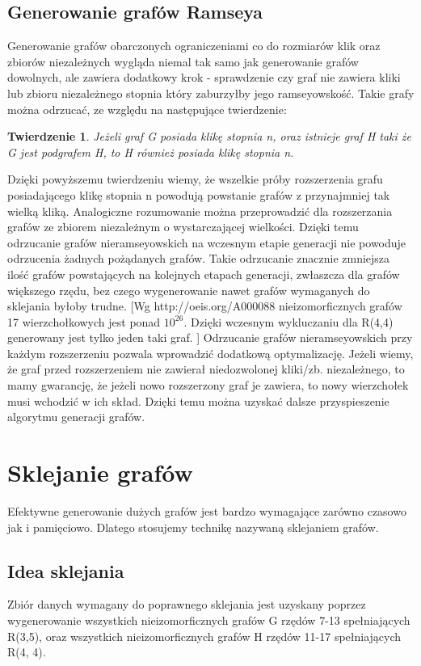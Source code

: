\documentclass[11pt]{article}
\newtheorem{theorem}{Twierdzenie}
\begin{document}
   \subsection{Generowanie grafów Ramseya}
   Generowanie grafów obarczonych ograniczeniami co do rozmiarów klik oraz zbiorów niezależnych wygląda niemal tak samo jak generowanie grafów dowolnych, 
   ale zawiera dodatkowy krok - sprawdzenie czy graf nie zawiera kliki lub zbioru niezależnego stopnia który zaburzyłby jego ramseyowskość. Takie grafy można odrzucać, ze względu na następujące twierdzenie:
     \begin{theorem}
      Jeżeli graf G posiada klikę stopnia n, oraz istnieje graf H taki że G jest podgrafem H, to H również posiada klikę stopnia n.
   \end{theorem}
  Dzięki powyższemu twierdzeniu wiemy, że wszelkie próby rozszerzenia grafu posiadającego klikę stopnia n powodują powstanie grafów z przynajmniej tak wielką kliką. Analogiczne rozumowanie można przeprowadzić dla rozszerzania grafów ze zbiorem niezależnym o wystarczającej wielkości. Dzięki temu odrzucanie grafów nieramseyowskich na wczesnym etapie generacji nie powoduje odrzucenia żadnych pożądanych grafów. Takie odrzucanie znacznie zmniejsza ilość grafów powstających na kolejnych etapach generacji, zwłaszcza dla grafów większego rzędu, bez czego wygenerowanie nawet grafów wymaganych do sklejania byłoby trudne.
[Wg http://oeis.org/A000088 nieizomorficznych grafów 17 wierzchołkowych jest ponad $10^{26}$. Dzięki wczesnym wykluczaniu dla R(4,4) generowany jest tylko jeden taki graf. ]
Odrzucanie grafów nieramseyowskich przy każdym rozszerzeniu pozwala wprowadzić dodatkową optymalizację. Jeżeli wiemy, że graf przed rozszerzeniem nie zawierał niedozwolonej kliki/zb. niezależnego, to mamy gwarancję, że jeżeli nowo rozszerzony graf je zawiera, to nowy wierzchołek musi wchodzić w ich skład. Dzięki temu można uzyskać dalsze przyspieszenie algorytmu generacji grafów.


\section{Sklejanie grafów}
Efektywne generowanie dużych grafów jest bardzo wymagające zarówno czasowo jak i pamięciowo. Dlatego stosujemy technikę nazywaną sklejaniem grafów. 

\subsection{Idea sklejania}
Zbiór danych wymagany do poprawnego sklejania jest uzyskany poprzez wygenerowanie wszystkich nieizomorficznych grafów G rzędów 7-13 spełniających R(3,5), oraz wszystkich nieizomorficznych grafów H rzędów 11-17 spełniających R(4, 4).
\end{document}
